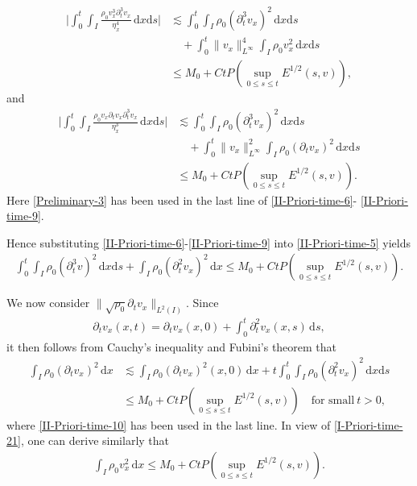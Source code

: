 \documentclass[11pt, reqno]{amsart}
\newcommand{\diff}{\mathrm{d}}
\numberwithin{equation}{section}
\begin{document}
\begin{equation}\label{II-Priori-time-8}
\begin{aligned}
\bigg|\int_0^t\int_I\frac{\rho_0v_x^3\partial_t^3v_x}{\eta_x^4}\,\diff x\diff s\bigg|
&\lesssim \int_0^t\int_I\rho_0(\partial_t^3v_x)^2\,\diff x\diff s\\
&\quad+\int_0^t\|v_x\|_{L^\infty}^4\int_I\rho_0v_x^2\,\diff x\diff s\\
&\leq M_0+Ct P(\sup_{0\leq s\leq t}E^{1/2}(s,v)),
\end{aligned}
\end{equation}
and
\begin{equation}\label{II-Priori-time-9}
\begin{aligned}
\bigg|\int_0^t\int_I\frac{\rho_0v_x\partial_tv_x\partial_t^3v_x}{\eta_x^3}\,\diff x\diff s\bigg|
&\lesssim \int_0^t\int_I\rho_0(\partial_t^3v_x)^2\,\diff x\diff s\\
&\quad+\int_0^t\|v_x\|_{L^\infty}^2\int_I\rho_0(\partial_tv_x)^2\,\diff x\diff s\\
&\leq M_0+Ct P(\sup_{0\leq s\leq t}E^{1/2}(s,v)).
\end{aligned}
\end{equation}
Here \eqref{Preliminary-3} has been used in the last line of \eqref{II-Priori-time-6}- \eqref{II-Priori-time-9}.

Hence substituting \eqref{II-Priori-time-6}-\eqref{II-Priori-time-9} into \eqref{II-Priori-time-5} yields
\begin{equation}\label{II-Priori-time-10}
\begin{aligned}
\int_0^t\int_I \rho_0(\partial_t^3v)^2\,\diff x\diff s
+\int_I\rho_0(\partial_t^2v_x)^2\,\diff x
\leq M_0+Ct P(\sup_{0\leq s\leq t}E^{1/2}(s,v)).
\end{aligned}
\end{equation}

We now consider \(\|\sqrt{\rho_0}\partial_tv_x\|_{L^2(I)}\). Since
\begin{equation*}
\begin{aligned}
\partial_tv_x(x,t)=\partial_tv_x(x,0)+\int_0^t\partial_t^2v_x(x,s)\,\diff s,
\end{aligned}
\end{equation*}
it then follows from Cauchy's inequality and Fubini's theorem that
\begin{equation}\label{I-Priori-time-21}
\begin{aligned}
\int_I \rho_0(\partial_tv_x)^2\,\diff x
&\lesssim \int_I \rho_0(\partial_tv_x)^2(x,0)\,\diff x
+t\int_0^t\int_I \rho_0(\partial_t^2v_x)^2\,\diff x\diff s\\
&\leq M_0+Ct P(\sup_{0\leq s\leq t}E^{1/2}(s,v))\quad \text{for\ small}\ t>0,
\end{aligned}
\end{equation}
where \eqref{II-Priori-time-10} has been used in the last line.
In view of \eqref{I-Priori-time-21}, one can derive similarly that
\begin{equation}\label{I-Priori-time-16}
\begin{aligned}
\int_I\rho_0v_x^2\,\diff x
\leq M_0+Ct P(\sup_{0\leq s\leq t}E^{1/2}(s,v)).
\end{aligned}
\end{equation}
\end{document}
